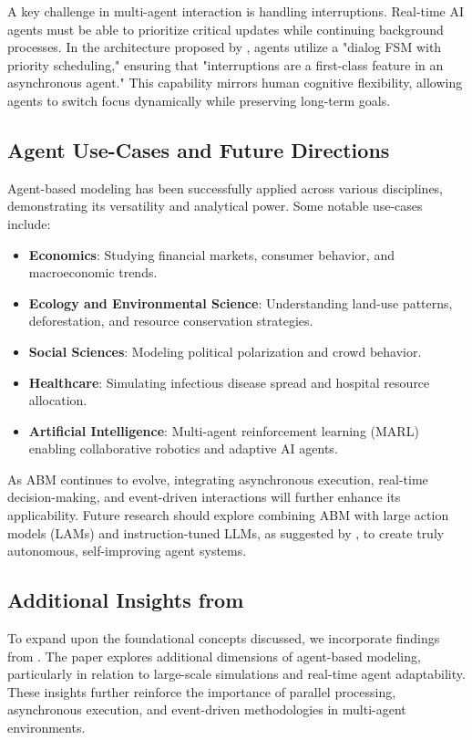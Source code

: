 A key challenge in multi-agent interaction is handling interruptions. Real-time AI agents must be able to prioritize critical updates while continuing background processes. In the architecture proposed by \cite{10}, agents utilize a "dialog FSM with priority scheduling," ensuring that "interruptions are a first-class feature in an asynchronous agent." This capability mirrors human cognitive flexibility, allowing agents to switch focus dynamically while preserving long-term goals.

\subsection{Agent Use-Cases and Future Directions}

Agent-based modeling has been successfully applied across various disciplines, demonstrating its versatility and analytical power. Some notable use-cases include: \begin{itemize} \item \textbf{Economics}: Studying financial markets, consumer behavior, and macroeconomic trends. \item \textbf{Ecology and Environmental Science}: Understanding land-use patterns, deforestation, and resource conservation strategies. \item \textbf{Social Sciences}: Modeling political polarization and crowd behavior. \item \textbf{Healthcare}: Simulating infectious disease spread and hospital resource allocation. \item \textbf{Artificial Intelligence}: Multi-agent reinforcement learning (MARL) enabling collaborative robotics and adaptive AI agents. \end{itemize}

As ABM continues to evolve, integrating asynchronous execution, real-time decision-making, and event-driven interactions will further enhance its applicability. Future research should explore combining ABM with large action models (LAMs) and instruction-tuned LLMs, as suggested by \cite{10}, to create truly autonomous, self-improving agent systems.

\subsection{Additional Insights from \cite{10}}

To expand upon the foundational concepts discussed, we incorporate findings from \cite{10}. The paper explores additional dimensions of agent-based modeling, particularly in relation to large-scale simulations and real-time agent adaptability. These insights further reinforce the importance of parallel processing, asynchronous execution, and event-driven methodologies in multi-agent environments.

